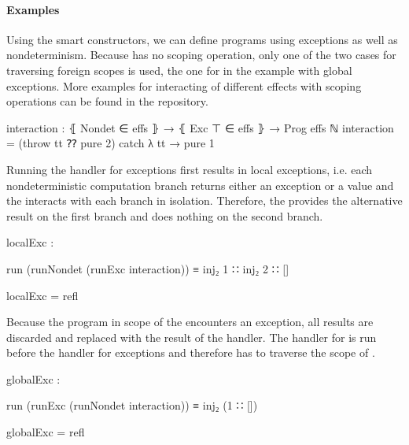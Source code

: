 \paragraph{Examples}
Using the smart constructors, we can define programs using exceptions as well as
nondeterminism.
Because  has no scoping operation, only one of the two
cases for traversing foreign scopes is used, the one for 
in the example with global exceptions.
More examples for interacting of different effects with scoping operations can
be found in the repository.

\begin{code}
interaction : ⦃ Nondet ∈ effs ⦄ → ⦃ Exc ⊤ ∈ effs ⦄ → Prog effs ℕ
interaction = (throw tt ⁇ pure 2) catch λ tt → pure 1
\end{code}
Running the handler for exceptions first results in local exceptions, i.e. each
nondeterministic computation branch returns either an exception or a value and
the  interacts with each branch in isolation.
Therefore, the  provides the alternative result
 on the first branch and does nothing on the second branch.

\begin{center}
\begin{code}
localExc :
\end{code}
\begin{code}[inline]
 run (runNondet (runExc interaction)) ≡ inj₂ 1 ∷ inj₂ 2 ∷ []
\end{code}
\begin{code}
localExc = refl
\end{code}
\end{center}
Because the program in scope of the  encounters an
exception, all results are discarded and replaced with the result of the handler.
The handler for  is run before the handler for exceptions
and therefore has to traverse the scope of .

\begin{center}
\begin{code}
globalExc :
\end{code}
\begin{code}[inline]
 run (runExc (runNondet interaction)) ≡ inj₂ (1 ∷ [])
\end{code}
\begin{code}
globalExc = refl
\end{code}
\end{center}

